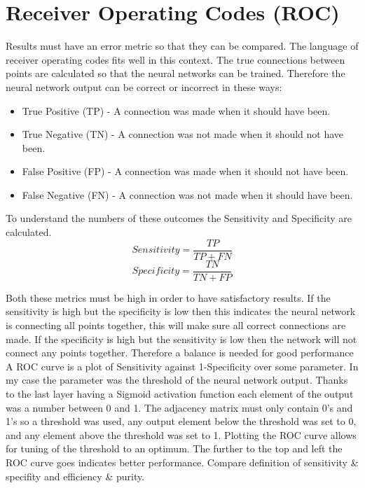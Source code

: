 \section{Receiver Operating Codes (ROC)}
Results must have an error metric so that they can be compared. The language of receiver operating codes fits well in this context. The true connections between points are calculated so that the neural networks can be trained. Therefore the neural network output can be correct or incorrect in these ways:
\begin{itemize}
    \item True Positive (TP) - A connection was made when it should have been.
    \item True Negative (TN) - A connection was not made when it should not have been.
    \item False Positive (FP) - A connection was made when it should not have been.
    \item False Negative (FN) - A connection was not made when it should have been.
\end{itemize}
To understand the numbers of these outcomes the Sensitivity and Specificity are calculated.
\[ Sensitivity = \frac{TP}{TP + FN} \]
\[ Specificity = \frac{TN}{TN + FP} \]

Both these metrics must be high in order to have satisfactory results. If the sensitivity is high but the specificity is low then this indicates the neural network is connecting all points together, this will make sure all correct connections are made. If the specificity is high but the sensitivity is low then the network will not connect any points together. Therefore a balance is needed for good performance\\
A ROC curve is a plot of Sensitivity against 1-Specificity over some parameter. In my case the parameter was the threshold of the neural network output. Thanks to the last layer having a Sigmoid activation function each element of the output was a number between 0 and 1. The adjacency matrix must only contain 0's and 1's so a threshold was used, any output element below the threshold was set to 0, and any element above the threshold was set to 1. Plotting the ROC curve allows for tuning of the threshold to an optimum. The further to the top and left the ROC curve goes indicates better performance.
Compare definition of sensitivity & specifity and efficiency & purity.

